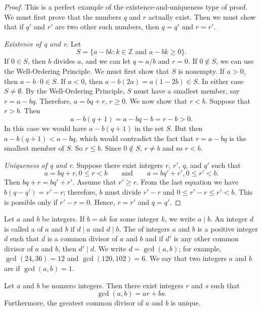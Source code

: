 \begin{proof}
This is a perfect example of the existence-and-uniqueness type of proof.  We must first prove that the numbers $q$ and $r$ actually  exist. Then we must show that if  $q'$ and $r'$ are two other such numbers, then $q = q'$ and $r = r'$. 
 
\emph{Existence of q and r}.
Let
\[
S = \{ a - bk : k \in {\mathbb Z} \text{ and } a - bk \geq 0 \}.
\]
If $0 \in S$, then $b$ divides $a$, and  we can let $q = a/b$ and $r = 0$.  If $0 \notin S$, we can use the Well-Ordering Principle.  We must first show that $S$ is nonempty.  If $a > 0$, then $a - b \cdot 0 \in S$. If $a < 0$, then $a - b(2a) = a(1 - 2b) \in S$.  In either case $S \neq \emptyset$.  By the Well-Ordering Principle, $S$ must have a smallest member, say $r = a - bq$. Therefore, $a = bq + r$, $r \geq 0$. We now show that $r < b$. Suppose that $r > b$. Then   
\[
a - b(q + 1)= a - bq - b = r - b > 0.
\]
In this case we would have $a - b(q + 1)$ in the set $S$. But then $a - b(q + 1) < a - bq$, which would contradict the fact that $r = a - bq$ is the smallest member  of $S$. So $r \leq b$.  Since $0 \notin S$, $r \neq b$ and so $r < b$. 
 
\emph{Uniqueness of q and r}.
Suppose there exist integers $r$, $r'$, $q$, and $q'$ such that
\[
a = bq + r, 0 \leq r < b 
\qquad
\text{and}
\qquad
a = bq' + r', 0 \leq r' < b.
\]
Then $ bq + r =  bq' + r'$.  Assume that $r' \geq r$.  From the last equation we have $b(q - q') = r' - r$; therefore, $b$ must divide $r' - r$ and $0 \leq r'- r \leq r' < b$.  This is possible only if $r' - r = 0$.  Hence, $r = r'$ and  $q = q'$. 
\end{proof}

\medskip

Let $a$ and $b$ be integers.  If $b = ak$ for some integer $k$, we write $a \mid b$\label{divides}.  An integer $d$ is called a  of $a$ and $b$ if $d \mid a$ and $d \mid b$.  The  of integers $a$ and $b$ is a positive integer $d$ such that $d$ is a common divisor  of $a$ and $b$ and if $d'$ is any other common divisor of $a$ and $b$, then $d' \mid d$.  We write $d = \gcd(a, b)$\label{greatestcd}; for example, $\gcd( 24, 36) = 12$ and $\gcd(120, 102) = 6$.  We say that two integers $a$ and $b$ are  if $\gcd( a, b ) = 1$. 

\begin{theorem}\label{integers:gcd_theorem}
Let $a$ and $b$ be nonzero integers. Then there exist integers $r$ and $s$ such that
\[
\gcd( a, b) = ar + bs.
\]
Furthermore, the greatest common divisor of $a$ and $b$ is unique.
\end{theorem}
 
